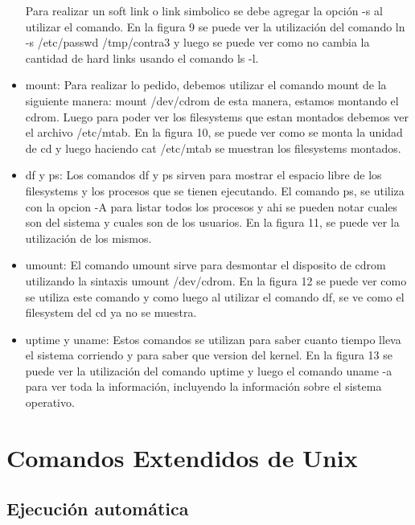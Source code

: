 \documentclass[a4paper, 12pt]{article}
\begin{document}
\begin{itemize}
Para realizar un soft link o link simbolico se debe agregar la opci\'on -s al utilizar el comando. En la figura 9 se puede ver la utilizaci\'on del comando ln -s /etc/passwd /tmp/contra3 y luego se puede ver como no cambia la cantidad de hard links usando el comando ls -l.

\item mount: Para realizar lo pedido, debemos utilizar el comando mount de la siguiente manera: mount /dev/cdrom de esta manera, estamos montando el cdrom. Luego para poder ver los filesystems que estan montados debemos ver el archivo /etc/mtab. En la figura 10, se puede ver como se monta la unidad de cd y luego haciendo cat /etc/mtab se muestran los filesystems montados.

\item df y ps: Los comandos df y ps sirven para mostrar el espacio libre de los filesystems y los procesos que se tienen ejecutando. El comando ps, se utiliza con la opcion -A para listar todos los procesos y ahi se pueden notar cuales son del sistema y cuales son de los usuarios. En la figura 11, se puede ver la utilizaci\'on de los mismos.

\item umount: El comando umount sirve para desmontar el disposito de cdrom utilizando la sintaxis umount /dev/cdrom. En la figura 12 se puede ver como se utiliza este comando y como luego al utilizar el comando df, se ve como el filesystem del cd ya no se muestra.

\item uptime y uname: Estos comandos se utilizan para saber cuanto tiempo lleva el sistema corriendo y para saber que version del kernel. En la figura 13 se puede ver la utilizaci\'on del comando uptime y luego el comando uname -a para ver toda la informaci\'on, incluyendo la informaci\'on sobre el sistema operativo.

\end{itemize}

\section*{Comandos Extendidos de Unix}

\subsection*{Ejecuci\'on autom\'atica}
\end{document}
